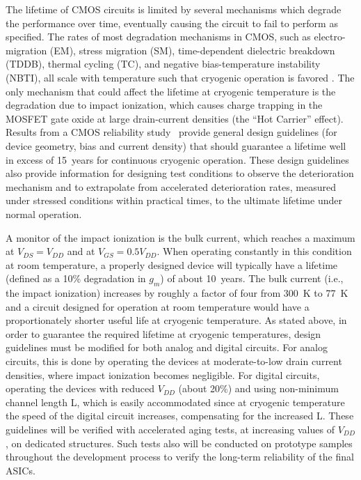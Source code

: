 The lifetime of CMOS circuits is limited by several mechanisms which degrade 
the performance over time, eventually causing the circuit to fail to perform as specified. 
The rates of most degradation mechanisms in CMOS, such as electro-migration (EM), 
stress migration (SM), time-dependent dielectric breakdown (TDDB), thermal cycling (TC), 
and negative bias-temperature instability (NBTI), all scale with temperature such that 
cryogenic operation is favored \cite{CMOS-lifetime}\cite{PMOS-model}. The only mechanism 
that could affect the lifetime at cryogenic temperature is the degradation due to 
impact ionization, which causes charge trapping in the MOSFET gate oxide at 
large drain-current densities (the ``Hot Carrier'' effect). Results from a CMOS reliability study~\cite{CMOS-reliability} 
provide general design guidelines (for device geometry, bias and current density) 
that should guarantee a lifetime well in excess of 15~years for continuous cryogenic operation. 
These design guidelines also provide information for designing test conditions to observe the 
deterioration mechanism and to extrapolate from accelerated deterioration rates, 
measured under stressed conditions within practical times, to the ultimate lifetime under normal operation.

A monitor of the impact ionization is the bulk current, which reaches a maximum at $V_{DS} = V_{DD}$ and at $V_{GS} = 0.5 V_{DD}$. 
When operating constantly in this condition at room temperature, a properly designed device 
will typically have a lifetime (defined as a 10\% degradation in $g_m$) of about 10~years. 
The bulk current (i.e., the impact ionization) increases by roughly a factor of four from 300~K to 77~K 
\cite{CMOS-reliability} and a circuit designed for operation at room temperature would have 
a proportionately shorter useful life at cryogenic temperature. As stated above, in order to guarantee 
the required lifetime at cryogenic temperatures, design guidelines must be modified for both analog 
and digital circuits. For analog circuits, this is done by operating the devices at moderate-to-low 
drain current densities, where impact ionization becomes negligible. For digital circuits, 
operating the devices with reduced $V_{DD}$ (about 20\%) and using non-minimum channel length L, 
which is easily accommodated since at cryogenic temperature the speed of the digital circuit increases, 
compensating for the increased L. These guidelines will be verified with accelerated aging tests, 
at increasing values of $V_{DD}$, on dedicated structures. Such tests also will be conducted on 
prototype samples throughout the development process to verify the long-term reliability of the final ASICs.

